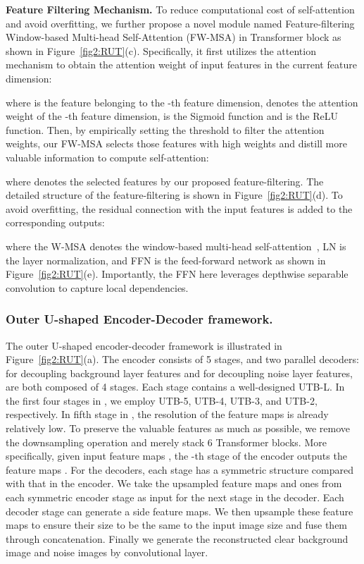 \noindent\textbf{Feature Filtering Mechanism.}
To reduce computational cost of self-attention and avoid overfitting, we further propose a novel module named Feature-filtering Window-based Multi-head Self-Attention (FW-MSA) in Transformer block as shown in Figure~\ref{fig2:RUT}(c).
Specifically, it first utilizes the attention mechanism to obtain the attention weight of input features in the current feature dimension:

where  is the feature belonging to the -th feature dimension,  denotes the attention weight of the -th feature dimension,  is the Sigmoid function and  is the ReLU function.
Then, by empirically setting the threshold  to filter the attention weights, our FW-MSA selects those features with high weights and distill more valuable information to compute self-attention:

where  denotes the selected features by our proposed feature-filtering. The detailed structure of the feature-filtering is shown in Figure~\ref{fig2:RUT}(d). To avoid overfitting, the residual connection with the input features  is added to the corresponding outputs:

where the W-MSA denotes the window-based multi-head self-attention~\cite{liu2021swin}, LN is the layer normalization, and FFN is the feed-forward network as shown in Figure~\ref{fig2:RUT}(e). Importantly, the FFN here leverages depthwise separable convolution to capture local dependencies.

\subsubsection{Outer U-shaped Encoder-Decoder framework.} The outer U-shaped encoder-decoder framework is illustrated in Figure~\ref{fig2:RUT}(a). The encoder  consists of 5 stages, and two parallel decoders:  for decoupling background layer features and  for decoupling noise layer features, are both composed of 4 stages. Each stage contains a well-designed UTB-L. In the first four stages in , we employ UTB-5, UTB-4, UTB-3, and UTB-2, respectively. In fifth stage in , the resolution of the feature maps is already relatively low. To preserve the valuable features as much as possible, we remove the downsampling operation and merely stack 6 Transformer blocks. More specifically, given input feature maps , the -th stage of the encoder outputs the feature maps . For the decoders, each stage has a symmetric structure compared with that in the encoder. We take the upsampled feature maps and ones from each symmetric encoder stage as input for the next stage in the decoder. Each decoder stage can generate a side feature maps. We then upsample these feature maps to ensure their size to be the same to the input image size and fuse them through concatenation. Finally we generate the reconstructed clear background image  and noise images by  convolutional layer.

